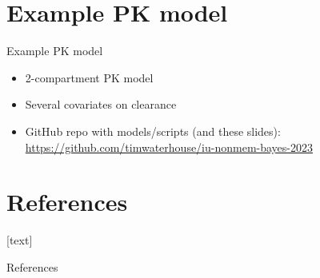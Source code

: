 \documentclass{beamer}
\begin{document}
\section{Example PK model}

\begin{frame}{Example PK model}

  \begin{itemize}
    \item 2-compartment PK model
    \item Several covariates on clearance
    \item GitHub repo with models/scripts (and these slides): \url{https://github.com/timwaterhouse/iu-nonmem-bayes-2023}
  \end{itemize}
\end{frame}

\section{References}

[text]

\begin{frame}[allowframebreaks]{References}

\scriptsize

% 



\end{frame}


  
\end{document}
